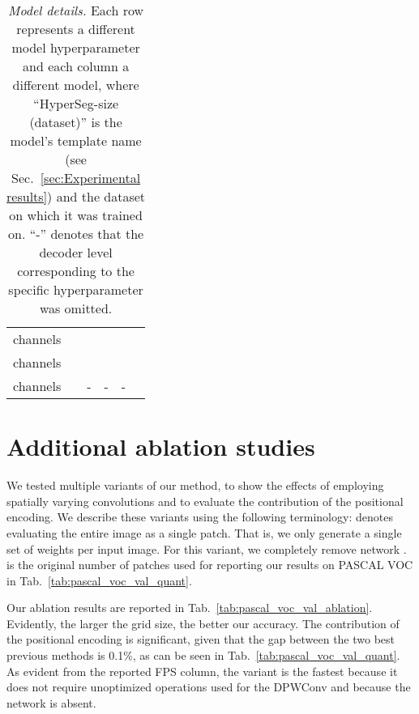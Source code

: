 \documentclass[final]{cvpr}
\newcommand{\minisection}[1]{\vspace{2mm}\noindent{\textbf{#1}.}}
\begin{document}
\begin{table*}[t!]
{\begin{tabular}{@{}lccccc@{}}
 channels      &  &
                       &
                       &
                       &
                       \\
                      
 channels      &  &
                       &
                       &
                       &
                       \\
                      
 channels      &  &
                      - &
                      - &
                      - &
                       \\
                      
\bottomrule

\end{tabular}
}
\caption{\emph{Model details.} Each row represents a different model hyperparameter and each column a different model, where ``HyperSeg-size (dataset)'' is the model's template name (see Sec.~\ref{sec:Experimental results}) and the dataset on which it was trained on. ``-'' denotes that the decoder level corresponding to the specific hyperparameter was omitted.}
\label{tab:model_details}
\end{table*}

\section{Additional ablation studies}
\minisection{Ablation study on PASCAL VOC}
We tested multiple variants of our method, to show the effects of employing spatially varying convolutions and to evaluate the contribution of the positional encoding. We describe these variants using the following terminology:  denotes evaluating the entire image as a single patch. That is, we only generate a single set of weights per input image. For this variant, we completely remove network .  is the original number of patches used for reporting our results on PASCAL VOC in Tab.~\ref{tab:pascal_voc_val_quant}. 

Our ablation results are reported in Tab.~\ref{tab:pascal_voc_val_ablation}. Evidently, the larger the grid size, the better our accuracy. The contribution of the positional encoding is significant, given that the gap between the two best previous methods is 0.1\%, as can be seen in Tab.~\ref{tab:pascal_voc_val_quant}. As evident from the reported FPS column, the  variant is the fastest because it does not require unoptimized operations used for the DPWConv and because the network  is absent. 
\end{document}
